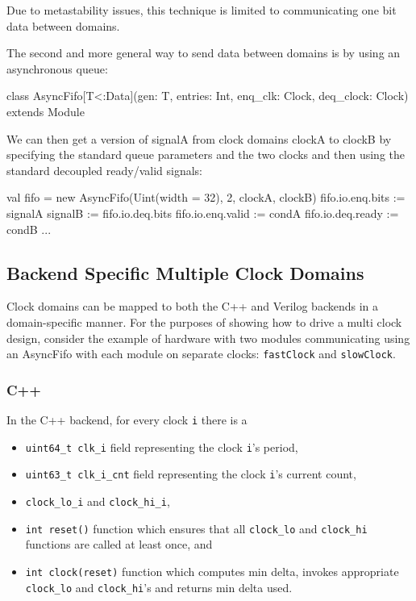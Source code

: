\documentclass[10pt,twocolumn]{article}
\begin{document}
\noindent
Due to metastability issues, this technique is limited to communicating one bit data between domains.

The second and more general way to send data between domains is by using an asynchronous queue:

\begin{scala}
class AsyncFifo[T<:Data](gen: T, entries: Int, enq_clk: Clock, deq_clock: Clock)
  extends Module
\end{scala}

\noindent
We can then get a version of signalA from clock domains clockA to clockB by
specifying the standard queue parameters and the two clocks and then using the
standard decoupled ready/valid signals:

\begin{scala}
val fifo = new AsyncFifo(Uint(width = 32), 2, clockA, clockB)
fifo.io.enq.bits  := signalA
signalB           := fifo.io.deq.bits
fifo.io.enq.valid := condA
fifo.io.deq.ready := condB
...
\end{scala}

\subsection{Backend Specific Multiple Clock Domains}

Clock domains can be mapped to both the C++ and Verilog backends in a
domain-specific manner.  For the purposes of showing how to drive a multi
clock design, consider the example of hardware with two modules communicating
using an AsyncFifo with each module on separate clocks: \verb+fastClock+ and
\verb+slowClock+.

\subsubsection{C++}

In the C++ backend, for every clock \verb+i+ there is a
\begin{itemize}
\item \verb+uint64_t clk_i+ field representing the clock \verb+i+'s period,
\item \verb+uint63_t clk_i_cnt+ field representing the clock \verb+i+'s current count,
\item \verb+clock_lo_i+ and \verb+clock_hi_i+, 
\item \verb+int reset()+ function which ensures that all \verb+clock_lo+ and \verb+clock_hi+ functions are called at least once, and
\item \verb+int clock(reset)+ function which computes min delta, invokes appropriate \verb+clock_lo+ and \verb+clock_hi+'s and returns min delta used.
\end{itemize}
\end{document}
